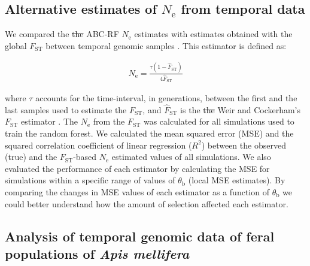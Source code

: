 \documentclass[a4paper, 12pt]{article}
\providecommand{\DIFdeltex}[1]{{\protect\color{red}\sout{#1}}}                      %
\providecommand{\DIFdelbegin}{} %
\providecommand{\DIFdelend}{} %
\providecommand{\DIFdel}[1]{\texorpdfstring{\DIFdeltex{#1}}{}} %
\newcommand{\DIFscaledelfig}{0.5}
\newlength{\DIFdelgraphicswidth} %
\newlength{\DIFdelgraphicsheight} %
\newcommand{\DIFdelincludegraphics}[2][]{%
\sbox{\DIFdelgraphicsbox}{\DIFOincludegraphics[#1]{#2}}%
\settoboxwidth{\DIFdelgraphicswidth}{\DIFdelgraphicsbox} %
\settoboxtotalheight{\DIFdelgraphicsheight}{\DIFdelgraphicsbox} %
\scalebox{\DIFscaledelfig}{%
\parbox[b]{\DIFdelgraphicswidth}{\usebox{\DIFdelgraphicsbox}\\[-\baselineskip] \rule{\DIFdelgraphicswidth}{0em}}\llap{\resizebox{\DIFdelgraphicswidth}{\DIFdelgraphicsheight}{%
\setlength{\unitlength}{\DIFdelgraphicswidth}%
\begin{picture}(1,1)%
\thicklines\linethickness{2pt} %
{\color[rgb]{1,0,0}\put(0,0){\framebox(1,1){}}}%
{\color[rgb]{1,0,0}\put(0,0){\line( 1,1){1}}}%
{\color[rgb]{1,0,0}\put(0,1){\line(1,-1){1}}}%
\end{picture}%
}\hspace*{3pt}}} %
} %
\DeclareRobustCommand{\DIFdelbegin}{\DIFOdelbegin \let\includegraphics\DIFdelincludegraphics} %
\DeclareRobustCommand{\DIFdelend}{\DIFOaddend \let\includegraphics\DIFOincludegraphics} %
\begin{document}
\subsection*{Alternative estimates of $N_\mathrm{e}$ from temporal data}

We compared the \DIFdelbegin \DIFdel{the }\DIFdelend ABC-RF $N_\mathrm{e}$ estimates with estimates obtained with the global $F_\mathrm{ST}$ between temporal genomic samples \citep{Frachon:2017fw}. This estimator is defined as:

\begin{gather*}
\hat N_\mathrm{e} = \frac{\tau(1-\hat F_\mathrm{ST})}{4\hat F_\mathrm{ST} } 
\end{gather*}

\noindent where $\tau$ accounts for the time-interval, in generations, between the first and the last samples used to estimate the $F_\mathrm{ST}$, and $\hat F_\mathrm{ST}$ is the \DIFdelbegin \DIFdel{the }\DIFdelend Weir and Cockerham's $F_\mathrm{ST}$ estimator \citep{Weir:1984dx}. The $N_\mathrm{e}$ from the $F_\mathrm{ST}$ was calculated for all simulations used to train the random forest. We calculated the mean squared error (MSE) and the squared correlation coefficient of linear regression ($R^2$) between the observed (true) and the $F_\mathrm{ST}$-based $N_\mathrm{e}$ estimated values of all simulations. We also evaluated the performance of each estimator by calculating the MSE for simulations within a specific range of values of $\theta_\mathrm{b}$ (local MSE estimates). By comparing the changes in MSE values of each estimator as a function of $\theta_\mathrm{b}$ we could better understand how the amount of selection affected each estimator.

\subsection*{Analysis of temporal genomic data of feral populations of \textit{Apis mellifera}} 
\end{document}
